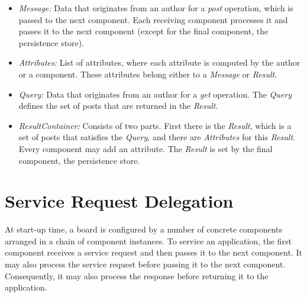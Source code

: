 \documentclass[oneside]{scrreprt}
\begin{document}
\begin{itemize}
	\item \emph{Message:} Data that originates from an author
		for a \emph{post} operation, which is passed
		to the next component. Each receiving component
		processes it and passes it to the
		next component (except for the final component,
		the persistence store).
	\item \emph{Attributes:} List of attributes, where each attribute is computed
		by the author or a component. These attributes belong either to a \emph{Message} or \emph{Result}.
	\item \emph{Query:} Data that originates from an author
		for a \emph{get} operation. The \emph{Query} defines the set of posts that are returned in the \emph{Result}.
	\item \emph{ResultContainer:} Consists of two parts. First there is the \emph{Result}, which is a set of posts that satisfies the \emph{Query}, and there are \emph{Attributes} for this \emph{Result}. Every component may add an attribute. The \emph{Result} is set by the final component, the persistence store.
\end{itemize}


\section{Service Request Delegation}

At start-up time, a board is configured by a number
of concrete components arranged in a chain of component
instances. To service an application, the first
component receives a service request and then passes
it to the next component. It may also process the
service request before passing it to the next
component. Consequently, it may also process the
response before returning it to the application.
\end{document}
